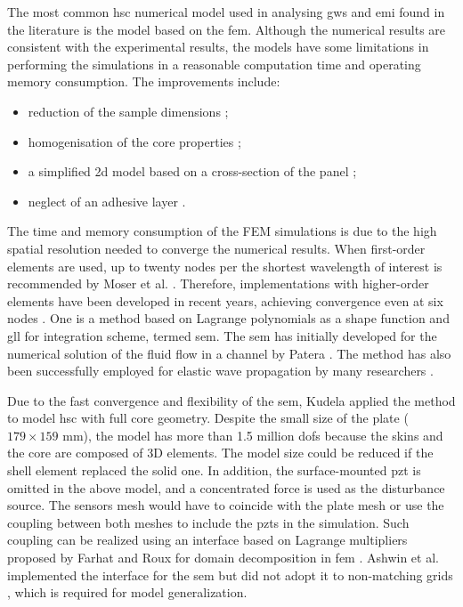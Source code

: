 \documentclass[11pt,a4paper,final]{report}
\begin{document}
The most common \ac{hsc} numerical model used in analysing \acp{gw} and \ac{emi} found in the literature is the model based on the \ac{fem}.
Although the numerical results are consistent with the experimental results, the models have some limitations in performing the simulations in a reasonable computation time and operating memory consumption.
The improvements include:
\begin{itemize}
\item reduction of the sample dimensions \cite{hosseini2013numerical, tian2015wavenumber};
\item homogenisation of the core properties \cite{catapano2014multi, zhou2020debonding};
\item a simplified \ac{2d} model based on a cross-section of the panel \cite{li2019detection};
\item neglect of an adhesive layer \cite{mustapha2013non}.
\end{itemize}
The time and memory consumption of the FEM simulations is due to the high spatial resolution needed to converge the numerical results.
When first-order elements are used, up to twenty nodes per the shortest wavelength of interest is recommended by Moser et al. \cite{moser1999modeling}.
Therefore, implementations with higher-order elements have been developed in recent years, achieving convergence even at six nodes \cite{willberg2012comparison}.
One is a method based on Lagrange polynomials as a shape function and \ac{gll} for integration scheme, termed \ac{sem}.
The \ac{sem} has initially developed for the numerical solution of the fluid flow in a channel by Patera \cite{patera1984spectral}. The method has also been successfully employed for elastic wave propagation by many researchers \cite{seriani1994spectral, kudela2007wave, ostachowicz2011guided, rucka2010experimental, schulte2011simulation, lonkar2014modeling, rekatsinas2017cubic, yu2020time, li2021hybrid}.

Due to the fast convergence and flexibility of the \ac{sem}, Kudela applied the method to model \ac{hsc} with full core geometry.
Despite the small size of the plate ($179 \times 159$ mm), the model has more than 1.5 million \acp{dof} because the skins and the core are composed of 3D elements.
The model size could be reduced if the shell element replaced the solid one.
In addition, the surface-mounted \ac{pzt} is omitted in the above model, and a concentrated force is used as the disturbance source.
The sensors mesh would have to coincide with the plate mesh or use the coupling between both meshes to include the \acp{pzt} in the simulation.
Such coupling can be realized using an interface based on Lagrange multipliers proposed by Farhat and Roux for domain decomposition in \ac{fem} \cite{farhat1991method}.
Ashwin et al. implemented the interface for the \ac{sem} but did not adopt it to non-matching grids \cite{ashwin2014formulation}, which is required for model generalization.
\end{document}
